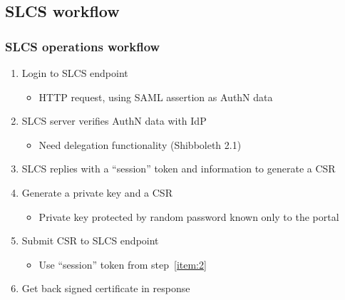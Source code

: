 \documentclass{beamer}
\newcommand{\+}{\vspace{1em}}
\begin{document}
\subsection{SLCS workflow}

\begin{frame}[label=more-slcs]
  \frametitle{SLCS operations workflow}
  \begin{enumerate}
  \item Login to SLCS endpoint
    \begin{itemize}
    \item HTTP request, using SAML assertion as AuthN data
    \end{itemize}
  \item SLCS server verifies AuthN data with IdP
    \begin{itemize}
    \item Need delegation functionality (Shibboleth 2.1)
    \end{itemize}
  \item\label{item:2} SLCS replies with a ``session'' token and information
    to generate a CSR
  \item Generate a private key and a CSR
    \begin{itemize}
    \item Private key protected by random password known only to the portal
    \end{itemize}
  \item Submit CSR to SLCS endpoint
    \begin{itemize}
    \item Use ``session'' token from step~\ref{item:2}
    \end{itemize}
  \item Get back signed certificate in response
  \end{enumerate}

  \+
  \hyperlink{slcs}{}
\end{frame}
\end{document}
